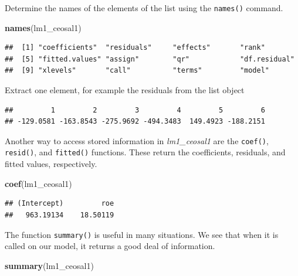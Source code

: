 \documentclass[]{book}
\newenvironment{Shaded}{\begin{snugshade}}{\end{snugshade}}
\newcommand{\CommentTok}[1]{\textcolor[rgb]{0.56,0.35,0.01}{\textit{#1}}}
\newcommand{\KeywordTok}[1]{\textcolor[rgb]{0.13,0.29,0.53}{\textbf{#1}}}
\newcommand{\NormalTok}[1]{#1}
\newcommand{\OperatorTok}[1]{\textcolor[rgb]{0.81,0.36,0.00}{\textbf{#1}}}
\begin{document}
Determine the names of the elements of the list using the
\texttt{names()} command.

\begin{Shaded}
\begin{Highlighting}[]
\KeywordTok{names}\NormalTok{(lm1_ceosal1)}
\end{Highlighting}
\end{Shaded}

\begin{verbatim}
##  [1] "coefficients"  "residuals"     "effects"       "rank"         
##  [5] "fitted.values" "assign"        "qr"            "df.residual"  
##  [9] "xlevels"       "call"          "terms"         "model"
\end{verbatim}

Extract one element, for example the residuals from the list object

\begin{Shaded}
\end{Shaded}

\begin{verbatim}
##         1         2         3         4         5         6 
## -129.0581 -163.8543 -275.9692 -494.3483  149.4923 -188.2151
\end{verbatim}

Another way to access stored information in \emph{lm1\_ceosal1} are the
\texttt{coef()}, \texttt{resid()}, and \texttt{fitted()} functions.
These return the coefficients, residuals, and fitted values,
respectively.

\begin{Shaded}
\begin{Highlighting}[]
\KeywordTok{coef}\NormalTok{(lm1_ceosal1)}
\end{Highlighting}
\end{Shaded}

\begin{verbatim}
## (Intercept)         roe 
##   963.19134    18.50119
\end{verbatim}

The function \texttt{summary()} is useful in many situations. We see
that when it is called on our model, it returns a good deal of
information.

\begin{Shaded}
\begin{Highlighting}[]
\KeywordTok{summary}\NormalTok{(lm1_ceosal1)}
\end{Highlighting}
\end{Shaded}
\end{document}
